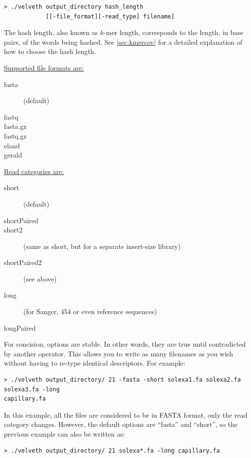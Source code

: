 \documentclass{article}
\begin{document}
\begin{verbatim}
> ./velveth output_directory hash_length 
            [[-file_format][-read_type] filename]
\end{verbatim}

The hash length, also known as $k$-mer length, corresponds to the length, in base pairs, of the words being hashed. See \ref{sec:kmercov} for a detailed explanation of how to choose the hash length.

\underline{Supported file formats are:}
\begin{description}
\item[fasta] (default) 
\item[fastq]
\item[fasta.gz]
\item[fastq.gz]
\item[eland]
\item[gerald]
\end{description}

\underline{Read categories are:}
\begin{description}
\item[short] (default)
\item[shortPaired]
\item[short2] (same as short, but for a separate insert-size library)
\item[shortPaired2] (see above) 
\item[long] (for Sanger, 454 or even reference sequences)
\item[longPaired]
\end{description}

For concision, options are stable. In other words, they are true until
contradicted by another operator. This allows you to write as many filenames
as you wish without having to re-type identical descriptors.  For example:
\begin{verbatim}
> ./velveth output_directory/ 21 -fasta -short solexa1.fa solexa2.fa solexa3.fa -long
capillary.fa
\end{verbatim}

In this example, all the files are considered to be in FASTA format,
only the read category changes. However, the default options are ``fasta'' and ``short'', so the previous example
can also be written as:

\begin{verbatim}
> ./velveth output_directory/ 21 solexa*.fa -long capillary.fa
\end{verbatim}
\end{document}

